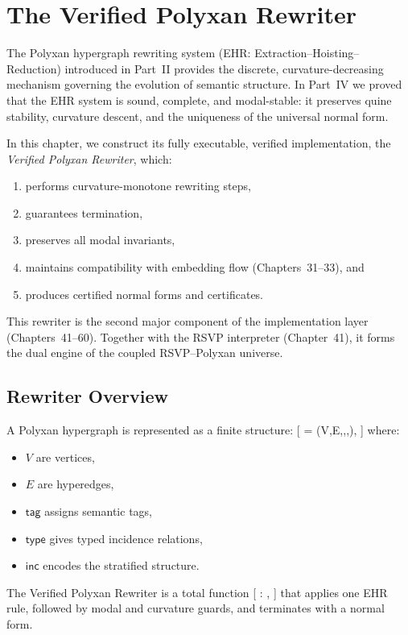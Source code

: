 \chapter{The Verified Polyxan Rewriter}
\label{ch:42}

The Polyxan hypergraph rewriting system (EHR: Extraction--Hoisting--Reduction) introduced in Part~II provides the discrete, curvature-decreasing mechanism governing the evolution of semantic structure.
In Part~IV we proved that the EHR system is sound, complete, and modal-stable: it preserves quine stability, curvature descent, and the uniqueness of the universal normal form.

In this chapter, we construct its fully executable, verified implementation, the \emph{Verified Polyxan Rewriter}, which:
\begin{enumerate}
\item performs curvature-monotone rewriting steps,
\item guarantees termination,
\item preserves all modal invariants,
\item maintains compatibility with embedding flow (Chapters~31--33), and
\item produces certified normal forms and certificates.
\end{enumerate}

This rewriter is the second major component of the implementation layer (Chapters~41--60).
Together with the RSVP interpreter (Chapter~41), it forms the dual engine of the coupled RSVP--Polyxan universe.

\section{Rewriter Overview}

A Polyxan hypergraph is represented as a finite structure:
[
 = (V,E,,,),
]
where:
\begin{itemize}
\item $V$ are vertices,
\item $E$ are hyperedges,
\item $\mathsf{tag}$ assigns semantic tags,
\item $\mathsf{type}$ gives typed incidence relations,
\item $\mathsf{inc}$ encodes the stratified structure.
\end{itemize}

The Verified Polyxan Rewriter is a total function
[
 :  \to {},
]
that applies one EHR rule, followed by modal and curvature guards, and terminates with a normal form.

